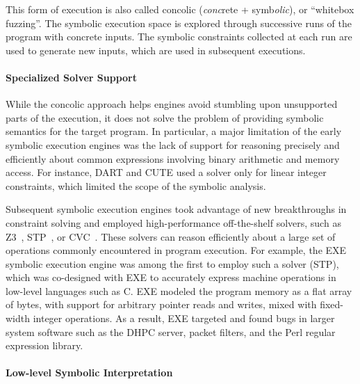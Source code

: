 This form of execution is also called concolic (\emph{conc}rete + symb\emph{olic}), or ``whitebox fuzzing''.  The symbolic execution space is explored through successive runs of the program with concrete inputs.  The symbolic constraints collected at each run are used to generate new inputs, which are used in subsequent executions.


\paragraph{Specialized Solver Support}


While the concolic approach helps engines avoid stumbling upon unsupported parts of the execution, it does not solve the problem of providing symbolic semantics for the target program.
%
In particular, a major limitation of the early symbolic execution engines was the lack of support for reasoning precisely and efficiently about common expressions involving binary arithmetic and memory access.  For instance, DART and CUTE used a solver only for linear integer constraints, which limited the scope of the symbolic analysis.

Subsequent symbolic execution engines took advantage of new breakthroughs in constraint solving and employed high-performance off-the-shelf solvers, such as Z3~\cite{Z3}, STP~\cite{stp}, or CVC~\cite{cvc}.  These solvers can reason efficiently about a large set of operations commonly encountered in program execution.
%
For example, the EXE~\cite{exe} symbolic execution engine was among the first to employ such a solver (STP), which was co-designed with EXE to accurately express machine operations in low-level languages such as C.
%
EXE modeled the program memory as a flat array of bytes, with support for arbitrary pointer reads and writes, mixed with fixed-width integer operations.
%
As a result, EXE targeted and found bugs in larger system software such as the  DHPC server, packet filters, and the  Perl regular expression library.

\paragraph{Low-level Symbolic Interpretation}

